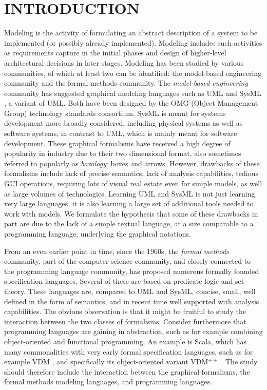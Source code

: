\section{INTRODUCTION}
\label{sec:introduction}

Modeling is the activity of formulating an abstract description of a
system to be implemented (or possibly already implemented). Modeling
includes such activities as requirements capture in the initial phases
and design of higher-level architectural decisions in later
stages. Modeling has been studied by various communities, of which at
least two can be identified: the model-based engineering community and
the formal methods community. The {\em model-based engineering}
community has suggested graphical modeling languages such as UML
\cite{uml} and SysML \cite{sysml}, a variant of UML.  Both have been
designed by the OMG (Object Management Group) technology standards
consortium. SysML is meant for systems development more broadly
considered, including physical systems as well as software systems, in
contrast to UML, which is mainly meant for software development. These
graphical formalisms have received a high degree of popularity in
industry due to their two dimensional format, also sometimes referred
to popularly as {\em boxology}: boxes and arrows. However, drawbacks
of these formalisms include lack of precise semantics, lack of
analysis capabilities, tedious GUI operations, requiring lots
of visual real estate even for simple models, as well as large volumes
of technologies. Learning UML and SysML is not just learning very
large languages, it is also learning a large set of additional tools
needed to work with models. We formulate the hypothesis that some of these
drawbacks in part are due to the lack of a simple textual language, at
a size comparable to a programming language, underlying the
graphical notations.

From an even earlier point in time, since the 1960s, the {\em
  formal methods} community, part of the computer science community,
and closely connected to the programming language community, has
proposed numerous formally founded specification languages. Several of
these are based on predicate logic and set theory. These languages
are, compared to UML and SysML, concise, small, well defined in the
form of semantics, and in recent time well supported with analysis
capabilities. The obvious observation is that it might be fruitful to
study the interaction between the two classes of formalisms. Consider
furthermore that programming languages are gaining in abstraction,
such as for example combining object-oriented and functional
programming. An example is Scala, which has many commonalities with very early formal
specification languages, such as for example VDM \cite{vdm78}, and
specifically its object-oriented variant VDM$^{++}$
\cite{vdmplusplus05}.  The study should therefore include the
interaction between the graphical formalisms, the formal methods
modeling languages, and programming languages.

